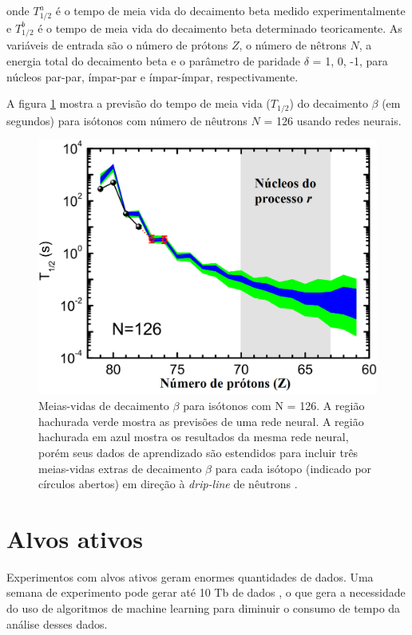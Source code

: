 \documentclass[a4paper,12pt,oneside]{book}
\begin{document}
\begin{appendices}
onde $T^{a}_{1/2}$ é o tempo de meia vida do decaimento beta medido experimentalmente e $T^{b}_{1/2}$ é o tempo de meia vida do decaimento beta determinado teoricamente. As variáveis de entrada são o número de prótons $Z$, o número de nêtrons $N$, a energia total do decaimento beta e o parâmetro de paridade $\delta$ = 1, 0, -1, para núcleos par-par, ímpar-par e ímpar-ímpar, respectivamente.

\par A figura \ref{fig:beta_decay} mostra a previsão do tempo de meia vida ($T_{1/2}$) do decaimento $\beta$ (em segundos) para isótonos com número de nêutrons $N$ = 126 usando redes neurais.

\begin{figure}[H]
    \centering
    \includegraphics[scale = 0.35]{figs/beta_predict_2.png}
    \caption{Meias-vidas de decaimento $\beta$ para isótonos com N = 126. A região hachurada verde mostra as previsões de uma rede neural. A região hachurada em azul mostra os resultados da mesma rede neural, porém seus dados de aprendizado são estendidos para incluir três meias-vidas extras de decaimento $\beta$ para cada isótopo (indicado por círculos abertos) em direção à \textit{drip-line} de nêutrons \cite{mlbetadecay}.}
    \label{fig:beta_decay}
\end{figure}

\section{Alvos ativos}

\par Experimentos com alvos ativos geram enormes quantidades de dados. Uma semana de experimento pode gerar até 10 Tb de dados \cite{KUCHERAML}, o que gera a necessidade do uso de algoritmos de machine learning para diminuir o consumo de tempo da análise desses dados.


\end{appendices}
\end{document}
